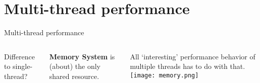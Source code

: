 \documentclass[english,compress]{beamer}
\begin{document}
\section{Multi-thread performance}
\begin{frame}{Multi-thread performance}
  \begin{columns}

      Difference to single-thread?
      \pause

      \bigskip
      \textbf{Memory System} is (about) the only shared resource.

      \bigskip
      All `interesting' performance behavior of multiple threads
      has to do with that.
      \texttt{[image: memory.png]}
  \end{columns}
\end{frame}
\end{document}
